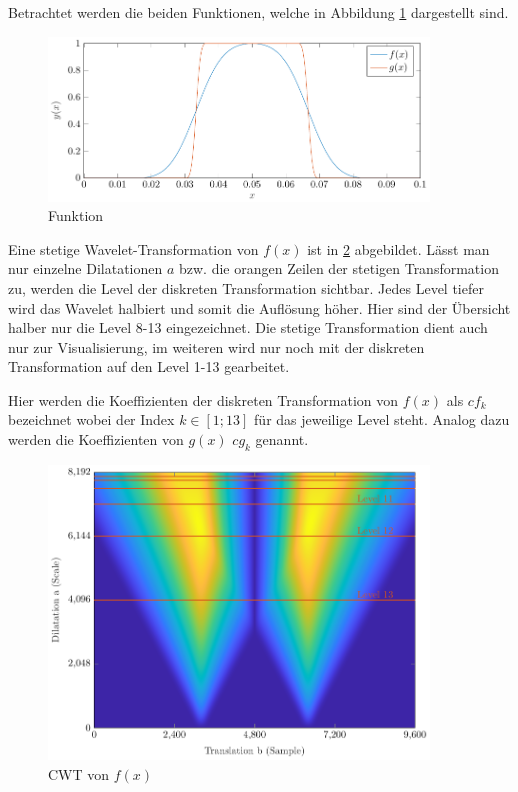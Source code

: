 Betrachtet werden die beiden Funktionen, welche in Abbildung \ref{deconvolve:1d} dargestellt sind.
\begin{figure}[h]
\centering
\includegraphics[width=0.9\textwidth]{./papers/deconvolve/pictures/1d.pdf}
\caption{Funktion\label{deconvolve:1d}}
\end{figure}
Eine stetige Wavelet-Transformation von $f(x)$ ist in \ref{deconvolve:y1_cwt} abgebildet.
Lässt man nur einzelne Dilatationen $a$ bzw. die orangen \glqq Zeilen\grqq{} der stetigen Transformation zu, werden die Level der diskreten Transformation sichtbar.
Jedes Level tiefer wird das Wavelet \glqq halbiert \grqq{} und somit die Auflösung höher.
Hier sind der Übersicht halber nur die Level 8-13 eingezeichnet. 
Die stetige Transformation dient auch nur zur Visualisierung, im weiteren wird nur noch mit der diskreten Transformation auf den Level 1-13 gearbeitet.

Hier werden die Koeffizienten der diskreten Transformation von $f(x)$ als $cf_k$ bezeichnet wobei der Index $k\in[1;13]$ für das jeweilige Level steht.
Analog dazu werden die Koeffizienten von $g(x)$ $cg_k$ genannt.
\begin{figure}[h]
\centering
\includegraphics[width=0.9\textwidth]{./papers/deconvolve/pictures/y1_cwt.pdf}
\caption{CWT von $f(x)$\label{deconvolve:y1_cwt}}
\end{figure}

